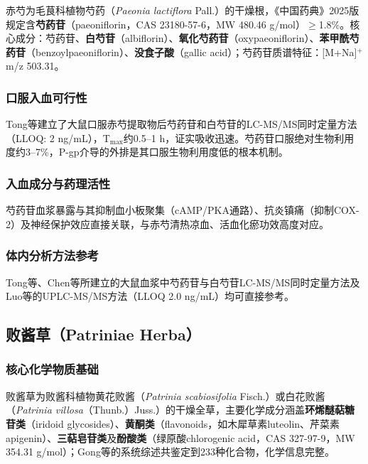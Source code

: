 \documentclass[12pt,a4paper,UTF8,openany]{ctexbook}
\newcommand{\compoundname}[1]{\textbf{#1}}
\newcommand{\herbname}[1]{\textit{#1}}
\begin{document}
赤芍为毛茛科植物芍药（\herbname{Paeonia lactiflora} Pall.）的干燥根，《中国药典》2025版规定含\compoundname{芍药苷}（paeoniflorin，CAS 23180-57-6，MW 480.46 g/mol）$\geq$1.8\%。核心成分：芍药苷、\compoundname{白芍苷}（albiflorin）、\compoundname{氧化芍药苷}（oxypaeoniflorin）、\compoundname{苯甲酰芍药苷}（benzoylpaeoniflorin）、\compoundname{没食子酸}（gallic acid）；芍药苷质谱特征：[M+Na]$^+$ m/z 503.31\cite{QiuLab2019}。

\subsubsection{口服入血可行性}

Tong等\cite{Tong2010}建立了大鼠口服赤芍提取物后芍药苷和白芍苷的LC-MS/MS同时定量方法（LLOQ: 2 ng/mL），T$_{\text{max}}$约0.5--1 h，证实吸收迅速。芍药苷口服绝对生物利用度约3--7\%，P-gp介导的外排是其口服生物利用度低的根本机制\cite{Molecules2022}。

\subsubsection{入血成分与药理活性}

芍药苷血浆暴露与其抑制血小板聚集（cAMP/PKA通路）、抗炎镇痛（抑制COX-2）及神经保护效应直接关联，与赤芍清热凉血、活血化瘀功效高度对应\cite{Hu2020}。

\subsubsection{体内分析方法参考}

Tong等\cite{Tong2010}、Chen等\cite{Chen2016P}所建立的大鼠血浆中芍药苷与白芍苷LC-MS/MS同时定量方法及Luo等\cite{QiuLab2019}的UPLC-MS/MS方法（LLOQ 2.0 ng/mL）均可直接参考。

\subsection{败酱草（Patriniae Herba）}

\subsubsection{核心化学物质基础}

败酱草为败酱科植物黄花败酱（\herbname{Patrinia scabiosifolia} Fisch.）或白花败酱（\herbname{Patrinia villosa}（Thunb.）Juss.）的干燥全草，主要化学成分涵盖\textbf{环烯醚萜糖苷类}（iridoid glycosides）、\textbf{黄酮类}（flavonoids，如木犀草素luteolin、芹菜素apigenin）、\textbf{三萜皂苷类}及\textbf{酚酸类}（绿原酸chlorogenic acid，CAS 327-97-9，MW 354.31 g/mol）；Gong等\cite{Gong2021}的系统综述共鉴定到233种化合物，化学信息完整\cite{Su2022}。
\end{document}
